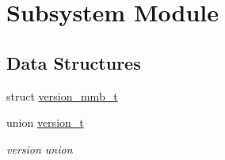 \hypertarget{group__subsys}{}\section{Subsystem Module}
\label{group__subsys}
\subsection*{Data Structures}
\begin{DoxyCompactItemize}
\item 
struct \hyperlink{structversion__mmb__t}{version\+\_\+mmb\+\_\+t}
\item 
union \hyperlink{unionversion__t}{version\+\_\+t}
\begin{DoxyCompactList}\small\item\em version union \end{DoxyCompactList}\end{DoxyCompactItemize}
